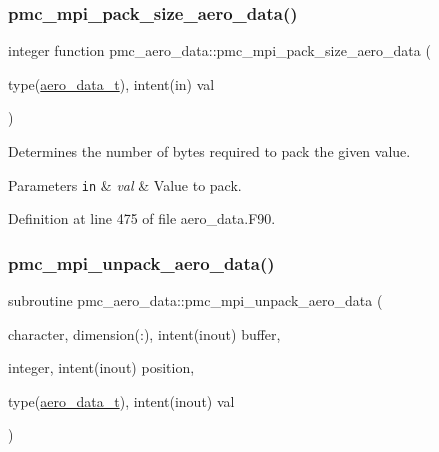 \subsubsection{\texorpdfstring{pmc\+\_\+mpi\+\_\+pack\+\_\+size\+\_\+aero\+\_\+data()}{pmc\_mpi\_pack\_size\_aero\_data()}}
{\footnotesize\ttfamily integer function pmc\+\_\+aero\+\_\+data\+::pmc\+\_\+mpi\+\_\+pack\+\_\+size\+\_\+aero\+\_\+data (\begin{DoxyParamCaption}\item[{type(\mbox{\hyperlink{structpmc__aero__data_1_1aero__data__t}{aero\+\_\+data\+\_\+t}}), intent(in)}]{val }\end{DoxyParamCaption})}



Determines the number of bytes required to pack the given value. 


\begin{DoxyParams}[1]{Parameters}
\mbox{\tt in}  & {\em val} & Value to pack. \\
\hline
\end{DoxyParams}


Definition at line 475 of file aero\+\_\+data.\+F90.

\mbox{\label{namespacepmc__aero__data_a1e003120eba522c801d92c1ebc719dd8}} 
\subsubsection{\texorpdfstring{pmc\+\_\+mpi\+\_\+unpack\+\_\+aero\+\_\+data()}{pmc\_mpi\_unpack\_aero\_data()}}
{\footnotesize\ttfamily subroutine pmc\+\_\+aero\+\_\+data\+::pmc\+\_\+mpi\+\_\+unpack\+\_\+aero\+\_\+data (\begin{DoxyParamCaption}\item[{character, dimension(\+:), intent(inout)}]{buffer,  }\item[{integer, intent(inout)}]{position,  }\item[{type(\mbox{\hyperlink{structpmc__aero__data_1_1aero__data__t}{aero\+\_\+data\+\_\+t}}), intent(inout)}]{val }\end{DoxyParamCaption})}



